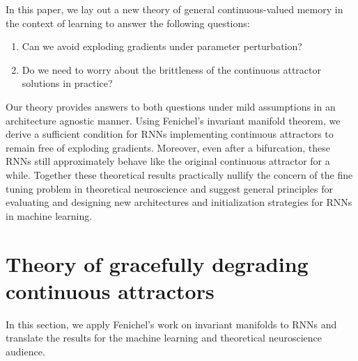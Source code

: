 \documentclass{article}
\newcounter{ct}
\theoremstyle{definition}
\theoremstyle{remark}
\begin{document}
In this paper, we lay out a new theory of general continuous-valued memory in the context of learning to answer the following questions:
\begin{enumerate}
    \item Can we avoid exploding gradients under parameter perturbation?
    \item Do we need to worry about the brittleness of the continuous attractor solutions in practice?
\end{enumerate}
Our theory provides answers to both questions under mild assumptions in an architecture agnostic manner.
Using Fenichel's invariant manifold theorem, we derive a sufficient condition for RNNs implementing continuous attractors to remain free of exploding gradients.
Moreover, even after a bifurcation, these RNNs still approximately behave like the original continuous attractor for a while.
Together these theoretical results practically nullify the concern of the fine tuning problem in theoretical neuroscience and suggest general principles for evaluating and designing new architectures and initialization strategies for RNNs in machine learning.


\section{Theory of gracefully degrading continuous attractors}\label{sec:theory}
In this section, we apply Fenichel's work on invariant manifolds to RNNs and translate the results for the machine learning and theoretical neuroscience audience.
\end{document}
